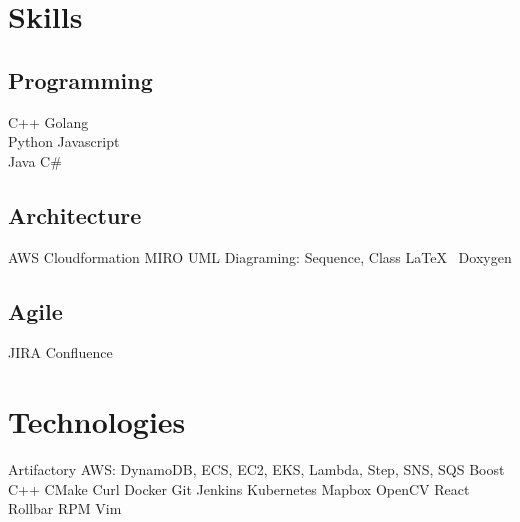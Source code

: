\documentclass[letterpaper]{fowles-resume} %
\begin{document}
\begin{minipage}[t]{0.33\textwidth}


\section{Skills}

\subsection{Programming}
C++ \textbullet{} Golang\\
Python \textbullet{} Javascript\\
Java \textbullet{} C\#
\smallskip
\subsection{Architecture}
AWS Cloudformation \textbullet{} MIRO \textbullet{} UML Diagraming: Sequence, Class
\textbullet{} \LaTeX\ \textbullet{} Doxygen
\smallskip
\subsection{Agile}
JIRA \textbullet{} Confluence
\smallskip



\sectionspace %

\section{Technologies}
Artifactory \textbullet{} AWS: DynamoDB, ECS, EC2, EKS, Lambda, Step, SNS, SQS \textbullet{} Boost C++ \textbullet{} CMake \textbullet{} Curl \textbullet{} Docker \textbullet{} Git \textbullet{} Jenkins \textbullet{} Kubernetes \textbullet{} Mapbox \textbullet{} OpenCV \textbullet{} React \textbullet{} Rollbar \textbullet{} RPM \textbullet{} Vim


\end{minipage}
\end{document}
